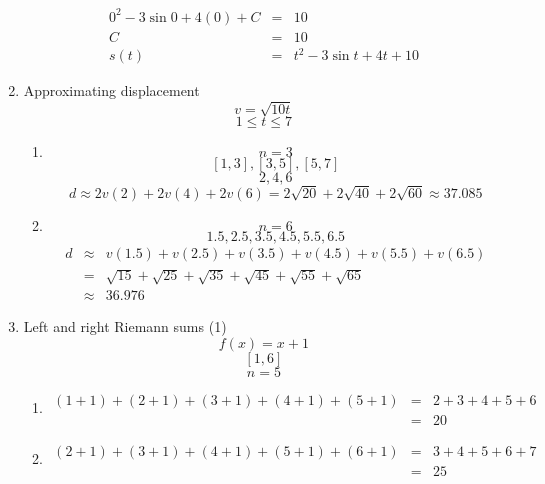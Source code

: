 \documentclass{article}
\begin{document}
\begin{enumerate}
\begin{eqnarray}
                0^2 - 3\sin{0} + 4(0) + C &=& 10 \\
                C &=& 10 \\
                s(t) &=& t^2 - 3\sin{t} + 4t + 10
            \end{eqnarray}
        \item Approximating displacement
            $$v = \sqrt{10t}$$
            $$1 \leq t \leq 7$$
            \begin{enumerate}
                \item
                $$n = 3$$
                $$[1,3],[3,5],[5,7]$$
                $$2,4,6$$
                $$d \approx 2v(2) + 2v(4) + 2v(6) = 2\sqrt{20} + 2\sqrt{40} + 2\sqrt{60} \approx 37.085$$
                \item
                $$n = 6$$
                $$1.5,2.5,3.5,4.5,5.5,6.5$$
                \begin{eqnarray}
                    d &\approx& v(1.5) + v(2.5) + v(3.5) + v(4.5) + v(5.5) + v(6.5) \\
                      &=& \sqrt{15} + \sqrt{25} + \sqrt{35} + \sqrt{45} + \sqrt{55} + \sqrt{65} \\
                      &\approx& 36.976
                \end{eqnarray}
            \end{enumerate}
        \item Left and right Riemann sums (1)
            $$f(x) = x + 1$$
            $$[1,6]$$
            $$n = 5$$
            \begin{enumerate}
                \item
                \begin{eqnarray}
                    \left(1 + 1\right) + \left(2 + 1\right) + \left(3 + 1\right) + \left(4 + 1\right) + \left(5 + 1\right) &=& 2 + 3 + 4 + 5 + 6 \\
                                                                                                                           &=& 20
                \end{eqnarray}
                \item
                \begin{eqnarray}
                    \left(2 + 1\right) + \left(3 + 1\right) + \left(4 + 1\right) + \left(5 + 1\right) + \left(6 + 1\right) &=& 3 + 4 + 5 + 6 + 7 \\
                                                                                                                           &=& 25

\end{eqnarray}
\end{enumerate}
\end{enumerate}
\end{document}
